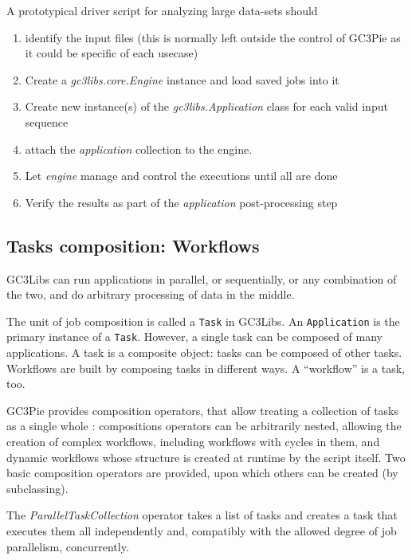 \documentclass{PoS}
\begin{document}
A prototypical driver script for analyzing large data-sets should
\begin{enumerate}
  \item identify the input files (this is normally left outside the
    control of GC3Pie as it could be specific of each usecase)
  \item Create a \emph{gc3libs.core.Engine} instance and load saved
    jobs into it
  \item Create new instance(s) of the \emph{gc3libs.Application} class
    for each valid input sequence 
  \item attach the \emph{application} collection to the engine.
  \item Let \emph{engine} manage and control the executions until all
    are done
  \item Verify the results as part of the \emph{application}
    post-processing step
\end{enumerate}

\subsection{Tasks composition: Workflows}
\label{sec:gc3pie-wkf}
GC3Libs can run applications in parallel, or sequentially, or any
combination of the two, and do arbitrary processing of data in the
middle.

The unit of job composition is called a \texttt{Task} in GC3Libs. An
\texttt{Application} is the primary instance of a
\texttt{Task}. However, a single task can be composed of many
applications. A task is a composite object: tasks can be composed of
other tasks. Workflows are built by composing tasks in different
ways. A ``workflow'' is a task, too.

GC3Pie provides composition operators, that allow treating a
collection of tasks as a single whole
\cite{gc3pie-euroscipy2011-poster}: compositions operators can be
arbitrarily nested, allowing the creation of complex workflows,
including workflows with cycles in them, and dynamic workflows whose
structure is created at runtime by the script itself. Two basic
composition operators are provided, upon which others can be created
(by subclassing).


The \emph{ParallelTaskCollection} operator takes a list of tasks and
creates a task that executes them all independently and, compatibly
with the allowed degree of job parallelism, concurrently.
\end{document}
